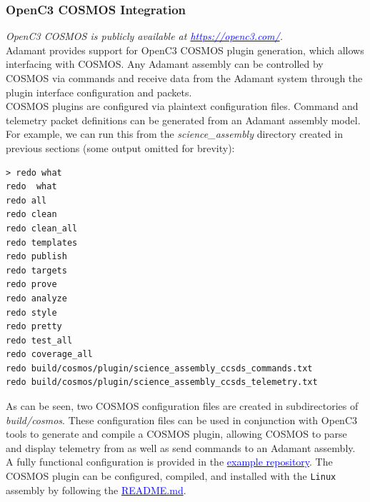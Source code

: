 \subsubsection{OpenC3 COSMOS Integration}

\textit{OpenC3 COSMOS is publicly available at \href{https://openc3.com/}{\textcolor{blue}{https://openc3.com/}}.} \\

Adamant provides support for OpenC3 COSMOS plugin generation, which allows interfacing with COSMOS. Any Adamant assembly can be controlled by COSMOS via commands and receive data from the Adamant system through the plugin interface configuration and packets. \\

COSMOS plugins are configured via plaintext configuration files. Command and telemetry packet definitions can be generated from an Adamant assembly model. For example, we can run this from the \textit{science\_assembly} directory created in previous sections (some output omitted for brevity):

\vspace{5mm} %
\begin{verbatim}
> redo what
redo  what
redo all
redo clean
redo clean_all
redo templates
redo publish
redo targets
redo prove
redo analyze
redo style
redo pretty
redo test_all
redo coverage_all
redo build/cosmos/plugin/science_assembly_ccsds_commands.txt
redo build/cosmos/plugin/science_assembly_ccsds_telemetry.txt
\end{verbatim}
\vspace{5mm} %

As can be seen, two COSMOS configuration files are created in subdirectories of \textit{build/cosmos}. These configuration files can be used in conjunction with OpenC3 tools to generate and compile a COSMOS plugin, allowing COSMOS to parse and display telemetry from as well as send commands to an Adamant assembly. \\

A fully functional configuration is provided in the \href{https://github.com/lasp/adamant_example/tree/main/src/assembly/linux/main/}{\textcolor{blue}{example repository}}. The COSMOS plugin can be configured, compiled, and installed with the \texttt{Linux} assembly by following the \href{https://github.com/lasp/adamant_example/tree/main/src/assembly/linux/main/README.md}{\textcolor{blue}{README.md}}. \\

